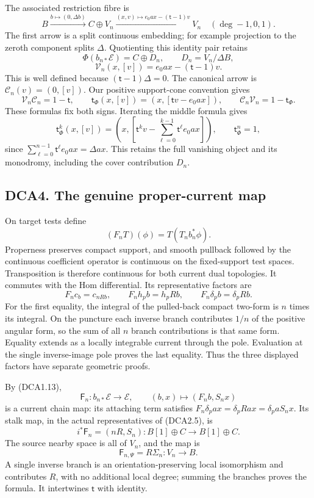 The associated restriction fibre is \[
B\xrightarrow{b\mapsto(0,\Delta b)}C\oplus V_n
\xrightarrow{(x,v)\mapsto e_0ax-(\mathsf t-1)v}V_n
\quad(\deg-1,0,1).
\tag{DCA3.6}
\] The first arrow is a split continuous embedding; for example
projection to the zeroth component splits \(\Delta\). Quotienting this
identity pair retains \[
\Phi(b_{n*}\mathscr E)=C\oplus D_n,\qquad
D_n=V_n/\Delta B,
\] \[
\boxed{\mathcal V_n(x,[v])=e_0ax-(\mathsf t-1)v.}
\tag{DCA3.7}
\] This is well defined because \((\mathsf t-1)\Delta=0\). The canonical
arrow is \(\mathcal C_n(v)=(0,[v])\). Our positive support-cone
convention gives \[
\mathcal V_n\mathcal C_n=1-\mathsf t,
\qquad
\mathsf t_\Phi(x,[v])=(x,[\mathsf t v-e_0ax]),\qquad
\mathcal C_n\mathcal V_n=1-\mathsf t_\Phi.
\tag{DCA3.8}
\] These formulas fix both signs. Iterating the middle formula gives \[
\mathsf t_\Phi^k(x,[v])
=\left(x,\left[\mathsf t^kv-\sum_{\ell=0}^{k-1}\mathsf t^\ell e_0ax\right]\right),
\qquad\mathsf t_\Phi^n=1,
\tag{DCA3.9}
\] since \(\sum_{\ell=0}^{n-1}\mathsf t^\ell e_0ax=\Delta ax\). This
retains the full vanishing object and its monodromy, including the cover
contribution \(D_n\).

\subsection{DCA4. The genuine proper-current
map}\label{dca4.-the-genuine-proper-current-map}

On target tests define \[
(F_nT)(\phi)=T(T_n b_n^*\phi).
\tag{DCA4.1}
\] Properness preserves compact support, and smooth pullback followed by
the continuous coefficient operator is continuous on the fixed-support
test spaces. Transposition is therefore continuous for both current dual
topologies. It commutes with the Hom differential. Its representative
factors are \[
F_nc_b=c_{nRb},\qquad
F_nh_pb=h_pRb,\qquad F_n\delta_pb=\delta_pRb.
\tag{DCA4.2}
\] For the first equality, the integral of the pulled-back compact
two-form is \(n\) times its integral. On the puncture each inverse
branch contributes \(1/n\) of the positive angular form, so the sum of
all \(n\) branch contributions is that same form. Equality extends as a
locally integrable current through the pole. Evaluation at the single
inverse-image pole proves the last equality. Thus the three displayed
factors have separate geometric proofs.

By (DCA1.13), \[
\boxed{\mathsf F_n:b_{n*}\mathscr E\to\mathscr E,\qquad
(b,x)\longmapsto(F_nb,S_nx)}
\tag{DCA4.3}
\] is a current chain map: its attaching term satisfies
\(F_n\delta_pax=\delta_pRax=\delta_paS_nx\). Its stalk map, in the
actual representatives of (DCA2.5), is \[
i^*\mathsf F_n=(nR,S_n):B[1]\oplus C\longrightarrow B[1]\oplus C.
\tag{DCA4.4}
\] The source nearby space is all of \(V_n\), and the map is \[
\boxed{\mathsf F_{n,\Psi}=R\Sigma_n:V_n\to B.}
\tag{DCA4.5}
\] A single inverse branch is an orientation-preserving local
isomorphism and contributes \(R\), with no additional local degree;
summing the branches proves the formula. It intertwines \(\mathsf t\)
with identity.

